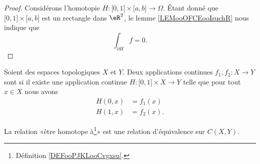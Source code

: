 \begin{proof}
    Considérons l'homotopie \( H\colon \mathopen[ 0 , 1 \mathclose]\times \mathopen[ a , b \mathclose]\to \Omega\). Étant donné que \( \mathopen[ 0 ,1  \mathclose]\times \mathopen[ a , b \mathclose]\) est un rectangle dans \( \eR^2\), le lemme \ref{LEMooOFCEooIsuchR} nous indique que 
    \begin{equation}
        \int_{\partial H}f=0.
    \end{equation}
\end{proof}

\begin{definition}[homotopie]       \label{DEFooPJKLooCvgxsu}
    Soient des espaces topologiques \( X\) et \( Y\). Deux applications continues \( f_1,f_2\colon X\to Y\) sont  si il existe une application continue \( H\colon \mathopen[ 0 , 1 \mathclose]\times X\to Y \) telle que pour tout \( x\in X \) nous avons
    \begin{subequations}
        \begin{align}
            H(0,x)&=f_1(x)\\
            H(1,x)&=f_2(x).
        \end{align}
    \end{subequations}
\end{definition}

\begin{lemma}       \label{LEMooMGFZooGOaGYl}
    La relation «être homotope à\footnote{Définition \ref{DEFooPJKLooCvgxsu}.}»  est une relation d'équivalence sur \( C(X,Y)\).
\end{lemma}


